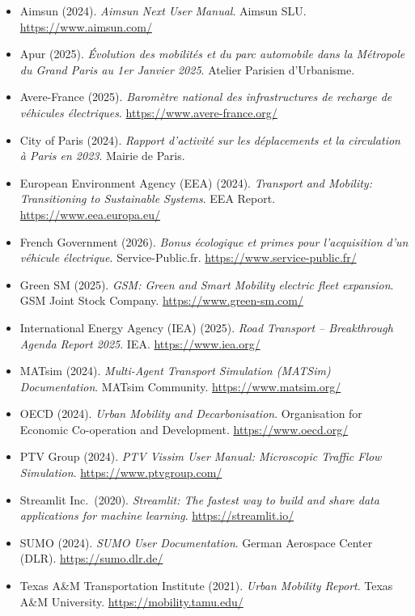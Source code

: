 \documentclass[10pt, a4paper]{article}
\providecommand{\tightlist}{}
\begin{document}
\begin{itemize}
\tightlist
\item
  Aimsun (2024). \emph{Aimsun Next User Manual}. Aimsun SLU.
  \url{https://www.aimsun.com/}
\item
  Apur (2025). \emph{Évolution des mobilités et du parc automobile dans
  la Métropole du Grand Paris au 1er Janvier 2025}. Atelier Parisien
  d'Urbanisme.
\item
  Avere-France (2025). \emph{Baromètre national des infrastructures de
  recharge de véhicules électriques}.
  \url{https://www.avere-france.org/}
\item
  City of Paris (2024). \emph{Rapport d'activité sur les déplacements et
  la circulation à Paris en 2023}. Mairie de Paris.
\item
  European Environment Agency (EEA) (2024). \emph{Transport and
  Mobility: Transitioning to Sustainable Systems}. EEA Report.
  \url{https://www.eea.europa.eu/}
\item
  French Government (2026). \emph{Bonus écologique et primes pour
  l'acquisition d'un véhicule électrique}. Service-Public.fr.
  \url{https://www.service-public.fr/}
\item
  Green SM (2025). \emph{GSM: Green and Smart Mobility electric fleet
  expansion}. GSM Joint Stock Company. \url{https://www.green-sm.com/}
\item
  International Energy Agency (IEA) (2025). \emph{Road Transport --
  Breakthrough Agenda Report 2025}. IEA. \url{https://www.iea.org/}
\item
  MATsim (2024). \emph{Multi-Agent Transport Simulation (MATSim)
  Documentation}. MATsim Community. \url{https://www.matsim.org/}
\item
  OECD (2024). \emph{Urban Mobility and Decarbonisation}. Organisation
  for Economic Co-operation and Development. \url{https://www.oecd.org/}
\item
  PTV Group (2024). \emph{PTV Vissim User Manual: Microscopic Traffic
  Flow Simulation}. \url{https://www.ptvgroup.com/}
\item
  Streamlit Inc.~(2020). \emph{Streamlit: The fastest way to build and
  share data applications for machine learning}.
  \url{https://streamlit.io/}
\item
  SUMO (2024). \emph{SUMO User Documentation}. German Aerospace Center
  (DLR). \url{https://sumo.dlr.de/}
\item
  Texas A\&M Transportation Institute (2021). \emph{Urban Mobility
  Report}. Texas A\&M University. \url{https://mobility.tamu.edu/}

\end{itemize}
\end{document}
